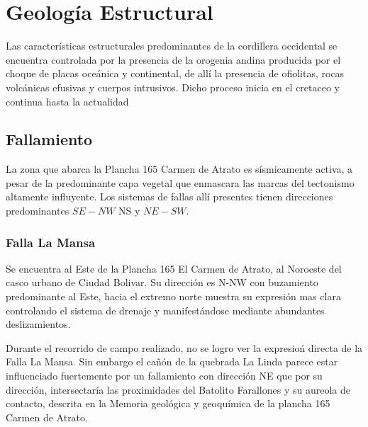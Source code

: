\section{Geolog\'ia Estructural}
Las caracter\'isticas estructurales predominantes de la cordillera occidental se encuentra controlada por la presencia de la orogenia andina producida por el choque de placas oce\'anica y continental, de all\'i la presencia de ofiolitas, rocas volc\'anicas efusivas y cuerpos intrusivos. Dicho proceso inicia en el cretaceo y continua hasta la actualidad \cite{orogeniacontinental}
\\

\subsection{Fallamiento}
La zona que abarca la Plancha 165 Carmen de Atrato es s\'ismicamente activa, a pesar de la predominante capa vegetal que enmascara las marcas del tectonismo altamente influyente. Los sistemas de fallas all\'i presentes tienen direcciones predominantes $SE-NW$ NS y $NE-SW$.\cite{orogeniacontinental}

\subsubsection{Falla La Mansa}
Se encuentra al Este de la Plancha 165 El Carmen de Atrato, al Noroeste del casco urbano de Ciudad Bolivar. Su direcci\'on es N-NW con buzamiento predominante al Este, hacia el extremo norte muestra su expresi\'on mas clara controlando el sistema de drenaje y manifest\'andose mediante abundantes deslizamientos. \cite{orogeniacontinental}

Durante el recorrido de campo realizado, no se logro ver la expresio\'n directa de la Falla La Mansa. Sin embargo el ca\~n\'on de la quebrada La Linda parece estar influenciado fuertemente por un fallamiento con direcci\'on NE que por su direcci\'on, intersectar\'ia las proximidades del Batolito Farallones y su aureola de contacto, descrita en la Memoria geol\'ogica y geoqu\'imica de la plancha 165 Carmen de Atrato.
 


